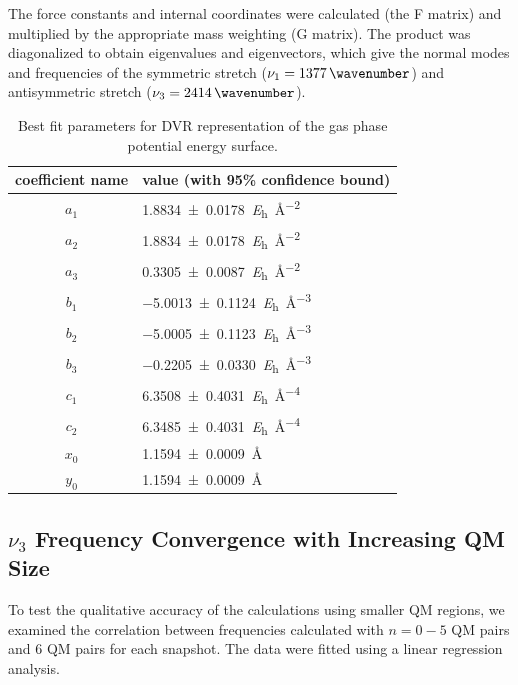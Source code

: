 \documentclass[%
  class = book,%
  crop = false,%
  float = true,%
  multi = true,%
  preview = false,%
]{standalone}
\begin{document}
The force constants and internal coordinates were calculated (the F matrix) and multiplied by the appropriate mass weighting (G matrix). The product was diagonalized to obtain eigenvalues and eigenvectors, which give the normal modes and frequencies of the symmetric stretch (\(\nu_{1} = \SI{1377}{\wavenumber}\)) and antisymmetric stretch (\(\nu_{3} = \SI{2414}{\wavenumber}\)).

\begin{table}
  \centering
  \caption[Fit parameters for DVR PES]{Best fit parameters for DVR representation of the gas phase  potential energy surface.}
  \label{paper_02:tab:S5}
  \begin{tabular}{cl}
    \toprule
    coefficient name & value (with 95\% confidence bound) \\
    \midrule
    \(a_1\) & \SI{1.8834 \pm 0.0178}{\hartree\per\angstrom\squared} \\
    \(a_2\) & \SI{1.8834 \pm 0.0178}{\hartree\per\angstrom\squared} \\
    \(a_3\) & \SI{0.3305 \pm 0.0087}{\hartree\per\angstrom\squared} \\
    \(b_1\) & \SI{-5.0013 \pm 0.1124}{\hartree\per\angstrom\cubed} \\
    \(b_2\) & \SI{-5.0005 \pm 0.1123}{\hartree\per\angstrom\cubed} \\
    \(b_3\) & \SI{-0.2205 \pm 0.0330}{\hartree\per\angstrom\cubed} \\
    \(c_1\) & \SI{6.3508 \pm 0.4031}{\hartree\per\angstrom\tothe{4}} \\
    \(c_2\) & \SI{6.3485 \pm 0.4031}{\hartree\per\angstrom\tothe{4}} \\
    \(x_0\) & \SI{1.1594 \pm 0.0009}{\angstrom} \\
    \(y_0\) & \SI{1.1594 \pm 0.0009}{\angstrom} \\
    \bottomrule
  \end{tabular}
\end{table}

\subsection{\texorpdfstring{\(\nu_{3}\)}{Asymmetric Stretch} Frequency Convergence with Increasing QM Size}
\label{paper_02:ssec:SI6}

To test the qualitative accuracy of the calculations using smaller QM regions, we examined the correlation between frequencies calculated with \(n = 0-5\) QM pairs and \num{6} QM pairs for each snapshot. The data were fitted using a linear regression analysis.
\end{document}
